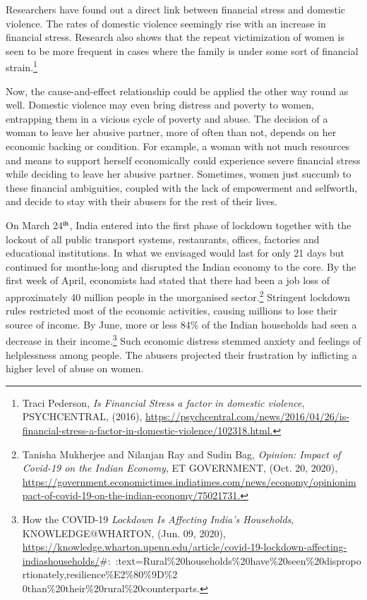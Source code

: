 \begin{multicols}{2}

\noi
Researchers have found out a direct link between financial stress and domestic violence. The
rates of domestic violence seemingly rise with an increase in financial stress. Research also
shows that the repeat victimization of women is seen to be more frequent in cases where the
family is under some sort of financial strain.\footnote{Traci Pederson, \textit{Is Financial Stress a factor in domestic violence}, PSYCHCENTRAL, (2016),
\url{https://psychcentral.com/news/2016/04/26/is-financial-stress-a-factor-in-domestic-violence/102318.html.}}

\noi
Now, the cause-and-effect relationship could be applied the other way round as well.
Domestic violence may even bring distress and poverty to women, entrapping them in a
vicious cycle of poverty and abuse. The decision of a woman to leave her abusive partner,
more of often than not, depends on her economic backing or condition. For example, a
woman with not much resources and means to support herself economically could experience
severe financial stress while deciding to leave her abusive partner. Sometimes, women just
succumb to these financial ambiguities, coupled with the lack of empowerment and selfworth, and decide to stay with their abusers for the rest of their lives.

\noi
On March 24$^{\rm th}$, India entered into the first phase of lockdown together with the lockout of all
public transport systems, restaurants, offices, factories and educational institutions. In what
we envisaged would last for only 21 days but continued for months-long and disrupted the
Indian economy to the core. By the first week of April, economists had stated that there had
been a job loss of approximately 40 million people in the unorganised sector.\footnote{Tanisha Mukherjee and Nilanjan Ray and Sudin Bag, \textit{Opinion: Impact of Covid-19 on the Indian Economy},
ET GOVERNMENT, (Oct. 20, 2020), \url{https://government.economictimes.indiatimes.com/news/economy/opinionimpact-of-covid-19-on-the-indian-economy/75021731.}}
 Stringent
lockdown rules restricted most of the economic activities, causing millions to lose their
source of income. By June, more or less 84\% of the Indian households had seen a decrease in their income.\footnote{How the COVID-19 \textit{Lockdown Is Affecting India’s Households}, KNOWLEDGE@WHARTON, (Jun. 09, 2020),
\url{https://knowledge.wharton.upenn.edu/article/covid-19-lockdown-affecting-indiashouseholds/}\#:~:text=Rural\%20households\%20have\%20seen\%20disproportionately,resilience\%E2\%80\%9D\%2
0than\%20their\%20rural\%20counterparts.} Such economic distress stemmed anxiety and feelings of helplessness among
people. The abusers projected their frustration by inflicting a higher level of abuse on women. 
 

\end{multicols}
